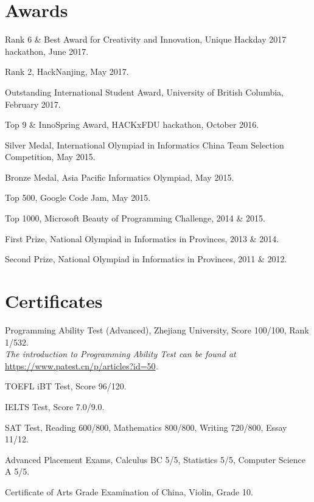 \documentclass[letterpaper]{article}
\renewenvironment{itemize}{
  \begin{list}{}{
    \setlength{\leftmargin}{1.5em}
  }
}{
  \end{list}
}
\begin{document}
\section*{Awards}

\begin{itemize}
  \item Rank 6 \& Best Award for Creativity and Innovation, Unique Hackday 2017 hackathon, June 2017.

  \item Rank 2, HackNanjing, May 2017.

  \item Outstanding International Student Award, University of British Columbia, February 2017.

  \item Top 9 \& InnoSpring Award, HACKxFDU hackathon, October 2016.

  \item Silver Medal, International Olympiad in Informatics China Team Selection Competition, May 2015.

  \item Bronze Medal, Asia Pacific Informatics Olympiad, May 2015.

  \item Top 500, Google Code Jam, May 2015.

  \item Top 1000, Microsoft Beauty of Programming Challenge, 2014 \& 2015.

  \item First Prize, National Olympiad in Informatics in Provinces, 2013 \& 2014.

  \item Second Prize, National Olympiad in Informatics in Provinces, 2011 \& 2012.
\end{itemize}


\section*{Certificates}

\begin{itemize}
  \item Programming Ability Test (Advanced), Zhejiang University, Score 100/100, Rank 1/532.\\
  \emph{The introduction to Programming Ability Test can be found at }\url{https://www.patest.cn/p/articles?id=50}\emph{.}

  \item TOEFL iBT Test, Score 96/120.

  \item IELTS Test, Score 7.0/9.0.

  \item SAT Test, Reading 600/800, Mathematics 800/800, Writing 720/800, Essay 11/12.

  \item Advanced Placement Exams, Calculus BC 5/5, Statistics 5/5, Computer Science A 5/5.

  \item Certificate of Arts Grade Examination of China, Violin, Grade 10.
\end{itemize}
\end{document}
